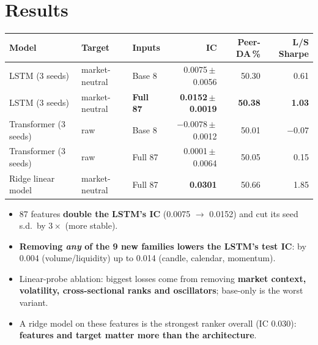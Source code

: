 \documentclass[10pt,a4paper]{article}
\begin{document}
\section{Results}
\begin{center}\footnotesize\setlength\tabcolsep{4pt}
\begin{tabular}{lllrrr}
\toprule
Model & Target & Inputs & IC & Peer-DA\,\% & L/S Sharpe\\\midrule
LSTM (3 seeds) & market-neutral & Base 8 & 0.0075\,$\pm$\,0.0056 & 50.30 & 0.61\\
LSTM (3 seeds) & market-neutral & \textbf{Full 87} & \textbf{0.0152\,$\pm$\,0.0019} & \textbf{50.38} & \textbf{1.03}\\
Transformer (3 seeds) & raw & Base 8 & $-0.0078$\,$\pm$\,0.0012 & 50.01 & $-0.07$\\
Transformer (3 seeds) & raw & Full 87 & 0.0001\,$\pm$\,0.0064 & 50.05 & 0.15\\
Ridge linear model & market-neutral & Full 87 & \textbf{0.0301} & 50.66 & 1.85\\\bottomrule
\end{tabular}
\end{center}
\begin{itemize}
  \item 87 features \textbf{double the LSTM's IC} (0.0075 $\to$ 0.0152) and cut its seed s.d.\ by $3\times$ (more stable).
  \item \textbf{Removing \emph{any} of the 9 new families lowers the LSTM's test IC}: by 0.004 (volume/liquidity) up to 0.014 (candle, calendar, momentum).
  \item Linear-probe ablation: biggest losses come from removing \textbf{market context, volatility, cross-sectional ranks and oscillators}; base-only is the worst variant.
  \item A ridge model on these features is the strongest ranker overall (IC 0.030): \textbf{features and target matter more than the architecture}.
\end{itemize}
\end{document}
